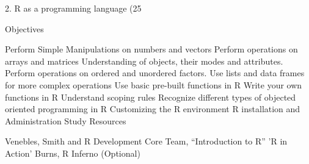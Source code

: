 2. R as a programming language (25%

Objectives

Perform Simple Manipulations on numbers and vectors
Perform operations on arrays and matrices
Understanding of objects, their modes and attributes.
Perform operations on ordered and unordered factors.
Use lists and data frames for more complex operations
Use basic pre-built functions in R
Write your own functions in R
Understand scoping rules
Recognize different types of objected oriented programming in R
Customizing the R environment
R installation and Administration
Study Resources

Venebles, Smith and R Development Core Team, “Introduction to R”
'R in Action'
Burns, R Inferno (Optional)
